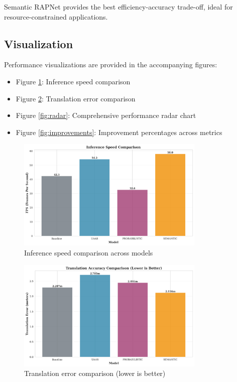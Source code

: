 \documentclass[11pt,a4paper]{article}
\begin{document}
Semantic RAPNet provides the best efficiency-accuracy trade-off, ideal for resource-constrained applications.

\subsection{Visualization}

Performance visualizations are provided in the accompanying figures:
\begin{itemize}
    \item Figure \ref{fig:inference}: Inference speed comparison
    \item Figure \ref{fig:translation}: Translation error comparison
    \item Figure \ref{fig:radar}: Comprehensive performance radar chart
    \item Figure \ref{fig:improvements}: Improvement percentages across metrics
\end{itemize}

\begin{figure}[h]
\centering
\includegraphics[width=0.8\textwidth]{benchmark_full_pipeline_results_charts_inference_speed.png}
\caption{Inference speed comparison across models}
\label{fig:inference}
\end{figure}

\begin{figure}[h]
\centering
\includegraphics[width=0.8\textwidth]{benchmark_full_pipeline_results_charts_translation_error.png}
\caption{Translation error comparison (lower is better)}
\label{fig:translation}
\end{figure}
\end{document}
